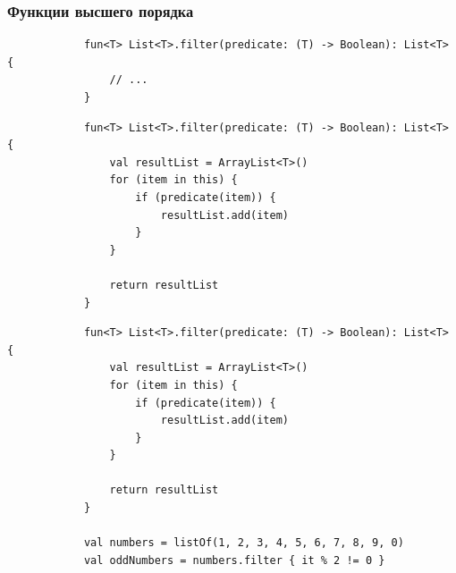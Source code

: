 \documentclass{beamer}
\begin{document}
\begin{frame}[fragile, t]
    \frametitle{Функции высшего порядка}
    \begin{overprint}
        \begin{verbatim}
            fun<T> List<T>.filter(predicate: (T) -> Boolean): List<T> {
                // ...
            }
        \end{verbatim}

        \begin{verbatim}
            fun<T> List<T>.filter(predicate: (T) -> Boolean): List<T> {
                val resultList = ArrayList<T>()
                for (item in this) {
                    if (predicate(item)) {
                        resultList.add(item)
                    }
                }

                return resultList
            }
        \end{verbatim}

        \begin{verbatim}
            fun<T> List<T>.filter(predicate: (T) -> Boolean): List<T> {
                val resultList = ArrayList<T>()
                for (item in this) {
                    if (predicate(item)) {
                        resultList.add(item)
                    }
                }

                return resultList
            }

            val numbers = listOf(1, 2, 3, 4, 5, 6, 7, 8, 9, 0)
            val oddNumbers = numbers.filter { it % 2 != 0 }
        \end{verbatim}
    \end{overprint}
\end{frame}
\end{document}
